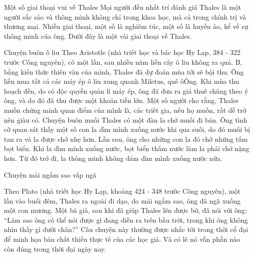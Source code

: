 \begin{multicols}{2}
{	Một số giai thoại vui về Thales 
	Mọi người đều nhất trí đánh giá Thales là một người sắc sảo và thông minh không chỉ trong khoa học, mà cả trong chính trị và thương mại. Nhiều giai thoại, một số là nghiêm túc, một số là huyền ảo, kể về sự thông minh của ông. Dưới đây là một vài giai thoại về Thales.   
	
	Chuyện buôn ô liu 
	Theo Aristotle (nhà triết học và bác học Hy Lạp, 384 - 322 trước Công nguyên), có một lần, sau nhiều năm liền cây ô liu không ra quả. B, bằng kiến thức thiên văn của mình, Thales đã dự đoán mùa tới sẽ bội thu. Ông liền mua tất cả các máy ép ô liu xung quanh Miletus, quê ôÔng. Khi mùa thu hoạch đến, do có độc quyền quản lí máy ép, ông đã đưa ra giá thuê chúng theo ý ông, và do đó đã thu được một khoản tiền lớn. Một số người cho rằng, Thales muốn chứng minh quan điểm của mình là, các triết gia, nếu họ muốn, rất dễ trở nên giàu có.
	Chuyện buôn muối 
	Thales có một đàn la chở muối đi bán. Ông tình cờ quan sát thấy một số con la dìm mình xuống nước khi qua suối, do đó muối bị tan ra và la được chở nhẹ hơn. Lần sau, ông cho những con la đó chở những tấm bọt biển. Khi la dìm mình xuống nước, bọt biển thấm nước làm la phải chở nặng hơn. Từ đó trở đi, la thông minh không dám dìm mình xuống nước nữa.
	
	Chuyện mải ngắm sao vấp ngã 
	
	Theo Plato (nhà triết học Hy Lạp, khoảng 424 - 348 trước Công nguyên), một lần vào buổi đêm, Thales ra ngoài đi dạo, do mải ngắm sao, ông đã ngã xuống một con mương. Một bà già, sau khi đã giúp Thales lên được bờ, đã nói với ông: “Làm sao ông có thể nói được gì đang diễn ra trên bầu trời, trong khi ông không nhìn thấy gì dưới chân?” Câu chuyện này thường được nhắc tới trong thời cổ đại để minh họa bản chất thiếu thực tế của các học giả. Và có lẽ nó vẫn phần nào còn đúng trong thời đại ngày nay.
	
}
\end{multicols}
